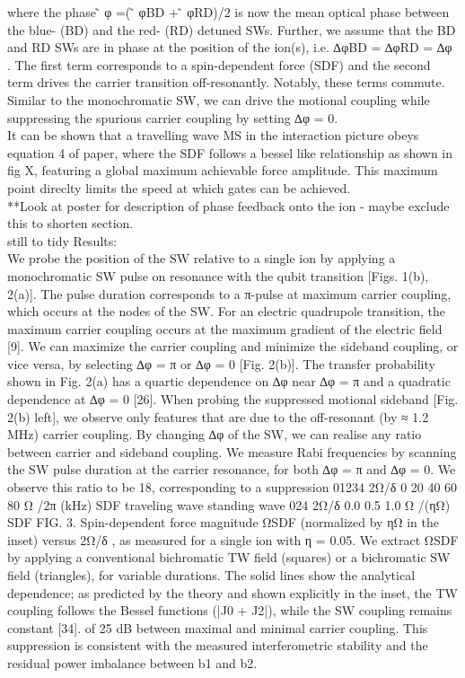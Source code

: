 \documentclass{article}
\begin{document}
    where the phase ̃ φ =( ̃ φBD + ̃ φRD)/2 is now the mean optical phase
    between the blue- (BD) and the red- (RD) detuned SWs. Further, we
    assume that the BD and RD SWs are in phase at the position of the
    ion(s), i.e. ∆φBD = ∆φRD = ∆φ . The first term corresponds to a
    spin-dependent force (SDF) and the second term drives the carrier
    transition off-resonantly. Notably, these terms commute. Similar to
    the monochromatic SW, we can drive the motional coupling while
    suppressing the spurious carrier coupling by setting ∆φ = 0.\\

    It can be shown that a travelling wave MS in the interaction picture obeys
    equation 4 of paper, where the SDF follows a bessel like
    relationship as shown in fig X, featuring a global maximum
    achievable force amplitude. This maximum point direclty limits the
    speed at which gates can be achieved.\\

    **Look at poster for description of phase feedback onto the ion -
    maybe exclude this to shorten section.\\

    still to tidy Results: \\
    We probe the position of the SW relative to a single ion by applying a
    monochromatic SW pulse on resonance with the qubit transition
    [Figs. 1(b), 2(a)]. The pulse duration corresponds to a π-pulse at
    maximum carrier coupling, which occurs at the nodes of the SW. For an
    electric quadrupole transition, the maximum carrier coupling occurs at
    the maximum gradient of the electric field [9]. We can maximize the
    carrier coupling and minimize the sideband coupling, or vice versa, by
    selecting ∆φ = π or ∆φ = 0 [Fig. 2(b)]. The transfer probability shown
    in Fig. 2(a) has a quartic dependence on ∆φ near ∆φ = π and a
    quadratic dependence at ∆φ = 0 [26]. When probing the suppressed
    motional sideband [Fig. 2(b) left], we observe only features that are
    due to the off-resonant (by ≈ 1.2 MHz) carrier coupling. By changing
    ∆φ of the SW, we can realise any ratio between carrier and sideband
    coupling. We measure Rabi frequencies by scanning the SW pulse
    duration at the carrier resonance, for both ∆φ = π and ∆φ = 0. We
    observe this ratio to be 18, corresponding to a suppression 01234 2Ω/δ
    0 20 40 60 80 Ω /2π (kHz) SDF traveling wave standing wave 024 2Ω/δ
    0.0 0.5 1.0 Ω /(ηΩ) SDF FIG. 3. Spin-dependent force magnitude ΩSDF
    (normalized by ηΩ in the inset) versus 2Ω/δ , as measured for a single
    ion with η = 0.05. We extract ΩSDF by applying a conventional
    bichromatic TW field (squares) or a bichromatic SW field (triangles),
    for variable durations. The solid lines show the analytical
    dependence; as predicted by the theory and shown explicitly in the
    inset, the TW coupling follows the Bessel functions (|J0 + J2|), while
    the SW coupling remains constant [34]. of 25 dB between maximal and
    minimal carrier coupling. This suppression is consistent with the
    measured interferometric stability and the residual power imbalance
    between b1 and b2.\\
\end{document}
